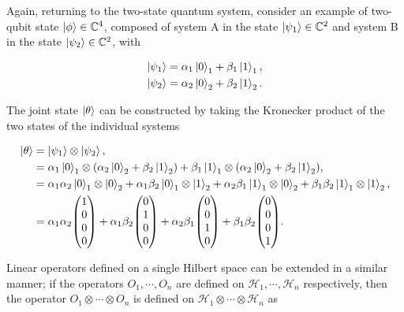 \bigskip
\noindent
Again, returning to the two-state quantum system, consider an example of two-qubit state $\ket{\phi} \in \mathbb{C}^4$, composed of system A in the state $\ket{\psi_1} \in \mathbb{C}^2$ and system B in the state $\ket{\psi_2} \in \mathbb{C}^2$, with

\begin{align*}
	\ket{\psi_1} &= \alpha_1\ket{0}_1 + \beta_1\ket{1}_1, \\
	\ket{\psi_2} &= \alpha_2\ket{0}_2 + \beta_2\ket{1}_2 .
\end{align*}

\noindent
The joint state $\ket{\theta}$ can be constructed by taking the Kronecker product
of the two states of the individual systems

\begin{align}
    \ket{\theta} &= \ket{\psi_1}\otimes\ket{\psi_2}, \nonumber \\
                &= \alpha_1\ket{0}_1\otimes(\alpha_2\ket{0}_2 +
                \beta_2\ket{1}_2) + \beta_1\ket{1}_1\otimes(\alpha_2\ket{0}_2 +
                \beta_2\ket{1}_2),\nonumber \\
                &= \alpha_1\alpha_2\ket{0}_1\otimes\ket{0}_2 +
                \alpha_1\beta_2\ket{0}_1\otimes\ket{1}_2 +
                \alpha_2\beta_1\ket{1}_1\otimes\ket{0}_2 +
                \beta_1\beta_2\ket{1}_1\otimes\ket{1}_2,\nonumber \\
                &= \alpha_1\alpha_2\mqty(1 \\ 0 \\ 0 \\ 0) +
                \alpha_1\beta_2\mqty(0 \\ 1 \\ 0 \\ 0) +
                \alpha_2\beta_1\mqty(0 \\ 0 \\ 1 \\ 0) +
                \beta_1\beta_2\mqty(0 \\  0 \\ 0 \\ 1).
\end{align}

\bigskip
\noindent
Linear operators defined on a single Hilbert space can be extended in a similar manner; if the operators $O_1, \cdots ,O_n$ are defined on $\mathcal{H}_1,\cdots,\mathcal{H}_n$ respectively, then the operator $O_1 \otimes \cdots \otimes O_n$ is defined on $\mathcal{H}_1\otimes \cdots \otimes \mathcal{H}_n$ as 

